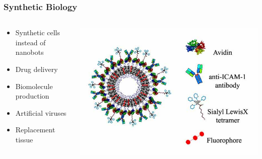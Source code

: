 \documentclass[xcolor={usenames,dvipsnames,svgnames},url=hyphens]{beamer}
\begin{document}
\begin{frame}
    \frametitle{Synthetic Biology}

    \begin{columns}[t]
        \begin{column}[t]{0.4\textwidth}
            \begin{itemize}
                \item Synthetic cells instead of nanobots
                \item Drug delivery
                \item Biomolecule production
                \item Artificial viruses
                \item Replacement tissue
            \end{itemize}
        \end{column}
        \begin{column}[T]{0.6\textwidth}
            \includegraphics[width=\textwidth]{Artificial-Cells.jpg} \footnotesize{\cite{artificial-cell}}
        \end{column}
    \end{columns}
\end{frame}
\end{document}
